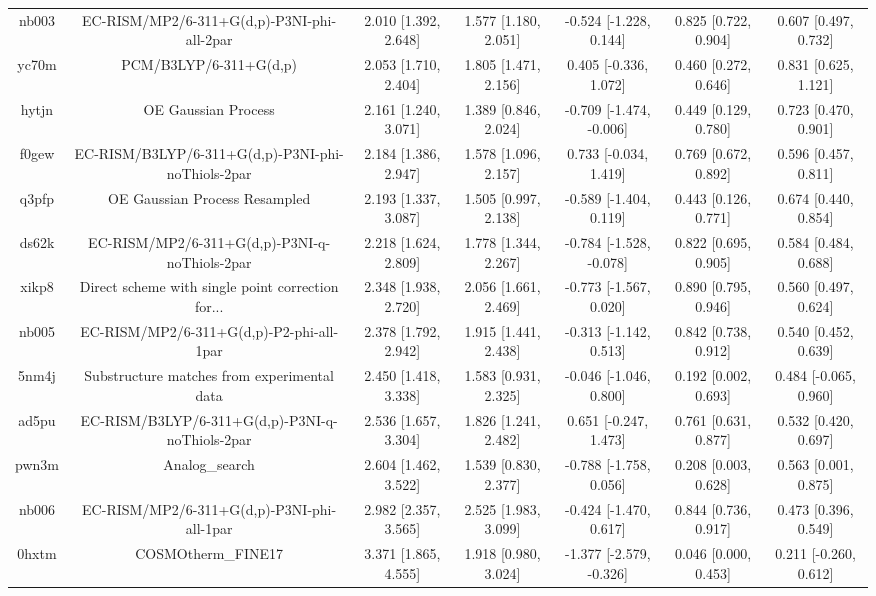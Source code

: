 \documentclass{article}
\begin{document}
\begin{center}
\begin{longtable}{|ccccccc|}
 nb003 &         EC-RISM/MP2/6-311+G(d,p)-P3NI-phi-all-2par &  2.010 [1.392, 2.648] &  1.577 [1.180, 2.051] &   -0.524 [-1.228, 0.144] &  0.825 [0.722, 0.904] &   0.607 [0.497, 0.732] \\
 yc70m &                             PCM/B3LYP/6-311+G(d,p) &  2.053 [1.710, 2.404] &  1.805 [1.471, 2.156] &    0.405 [-0.336, 1.072] &  0.460 [0.272, 0.646] &   0.831 [0.625, 1.121] \\
 hytjn &                                OE Gaussian Process &  2.161 [1.240, 3.071] &  1.389 [0.846, 2.024] &  -0.709 [-1.474, -0.006] &  0.449 [0.129, 0.780] &   0.723 [0.470, 0.901] \\
 f0gew &  EC-RISM/B3LYP/6-311+G(d,p)-P3NI-phi-noThiols-2par &  2.184 [1.386, 2.947] &  1.578 [1.096, 2.157] &    0.733 [-0.034, 1.419] &  0.769 [0.672, 0.892] &   0.596 [0.457, 0.811] \\
 q3pfp &                      OE Gaussian Process Resampled &  2.193 [1.337, 3.087] &  1.505 [0.997, 2.138] &   -0.589 [-1.404, 0.119] &  0.443 [0.126, 0.771] &   0.674 [0.440, 0.854] \\
 ds62k &      EC-RISM/MP2/6-311+G(d,p)-P3NI-q-noThiols-2par &  2.218 [1.624, 2.809] &  1.778 [1.344, 2.267] &  -0.784 [-1.528, -0.078] &  0.822 [0.695, 0.905] &   0.584 [0.484, 0.688] \\
 xikp8 &  Direct scheme with single point correction for... &  2.348 [1.938, 2.720] &  2.056 [1.661, 2.469] &   -0.773 [-1.567, 0.020] &  0.890 [0.795, 0.946] &   0.560 [0.497, 0.624] \\
 nb005 &           EC-RISM/MP2/6-311+G(d,p)-P2-phi-all-1par &  2.378 [1.792, 2.942] &  1.915 [1.441, 2.438] &   -0.313 [-1.142, 0.513] &  0.842 [0.738, 0.912] &   0.540 [0.452, 0.639] \\
 5nm4j &        Substructure matches from experimental data &  2.450 [1.418, 3.338] &  1.583 [0.931, 2.325] &   -0.046 [-1.046, 0.800] &  0.192 [0.002, 0.693] &  0.484 [-0.065, 0.960] \\
 ad5pu &    EC-RISM/B3LYP/6-311+G(d,p)-P3NI-q-noThiols-2par &  2.536 [1.657, 3.304] &  1.826 [1.241, 2.482] &    0.651 [-0.247, 1.473] &  0.761 [0.631, 0.877] &   0.532 [0.420, 0.697] \\
 pwn3m &                                     Analog\_search &  2.604 [1.462, 3.522] &  1.539 [0.830, 2.377] &   -0.788 [-1.758, 0.056] &  0.208 [0.003, 0.628] &   0.563 [0.001, 0.875] \\
 nb006 &         EC-RISM/MP2/6-311+G(d,p)-P3NI-phi-all-1par &  2.982 [2.357, 3.565] &  2.525 [1.983, 3.099] &   -0.424 [-1.470, 0.617] &  0.844 [0.736, 0.917] &   0.473 [0.396, 0.549] \\
 0hxtm &                                 COSMOtherm\_FINE17 &  3.371 [1.865, 4.555] &  1.918 [0.980, 3.024] &  -1.377 [-2.579, -0.326] &  0.046 [0.000, 0.453] &  0.211 [-0.260, 0.612] \\
\end{longtable}
\end{center}
\end{document}
